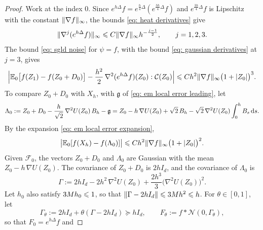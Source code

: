 \begin{proof}
    Work at the index $0$. Since $e^{h\Delta} f = e^{\frac h4 \Delta} ( e^{\frac{3h}{4} \Delta} f )$ and $e^{\frac{3h}{4} \Delta} f$ is Lipschitz with the constant $\lVert \nabla f \rVert_\infty$, the bounds \eqref{eq: heat derivatives} give
    \begin{equation}
        \lVert \nabla^j ( e^{h\Delta} f ) \rVert_\infty \leqslant C \lVert \nabla f \rVert_\infty h^{-\frac{j-1}{2}} , \qquad j = 1, 2, 3 .
        \label{eq: gaussian derivatives}
    \end{equation}
    The bound \eqref{eq: sgld noise} for $\psi = f$, with the bound \eqref{eq: gaussian derivatives} at $j = 3$, gives
    \begin{equation}
        \Bigl| \mathbb E_0\bigl[ f(Z_1) - f(Z_0 + D_0) \bigr] - \frac{h^2}{2}\, \nabla^2 ( e^{h\Delta} f )(Z_0) : \mathcal C(Z_0) \Bigr| \leqslant C h^2 \lVert \nabla f \rVert_\infty \bigl( 1 + |Z_0| \bigr)^3 .
        \label{eq: sgld lipschitz noise}
    \end{equation}
    To compare $Z_0 + D_0$ with $X_h$, with $\mathfrak g$ of \eqref{eq: em local error leading}, let
    \begin{equation*}
        \Lambda_0 := Z_0 + D_0 - \frac{h}{\sqrt2}\, \nabla^2 U(Z_0)\, B_h - \mathfrak g = Z_0 - h\, \nabla U(Z_0) + \sqrt2\, B_h - \sqrt2\, \nabla^2 U(Z_0) \int_0^h B_s\, \mathrm{d} s .
    \end{equation*}
    By the expansion \eqref{eq: em local error expansion},
    \begin{equation}
        \bigl| \mathbb E_0[ f(X_h) - f(\Lambda_0) ] \bigr| \leqslant C h^2 \lVert \nabla f \rVert_\infty \bigl( 1 + |Z_0| \bigr)^2 .
        \label{eq: sgld lambda replacement}
    \end{equation}
    Given $\mathcal F_0$, the vectors $Z_0 + D_0$ and $\Lambda_0$ are Gaussian with the mean $Z_0 - h\, \nabla U(Z_0)$. The covariance of $Z_0 + D_0$ is $2h I_d$, and the covariance of $\Lambda_0$ is
    \begin{equation*}
        \Gamma := 2h I_d - 2h^2\, \nabla^2 U(Z_0) + \frac{2h^3}{3} \bigl( \nabla^2 U(Z_0) \bigr)^2 .
    \end{equation*}
    Let $h_0$ also satisfy $3 M h_0 \leqslant 1$, so that $\lVert \Gamma - 2h I_d \rVert \leqslant 3 M h^2 \leqslant h$. For $\theta \in [0,1]$, let
    \begin{equation*}
        \Gamma_\theta := 2h I_d + \theta ( \Gamma - 2h I_d ) \succeq h I_d , \qquad F_\theta := f * \mathcal N(0, \Gamma_\theta) ,
    \end{equation*}
    so that $F_0 = e^{h\Delta} f$ and

\end{proof}
